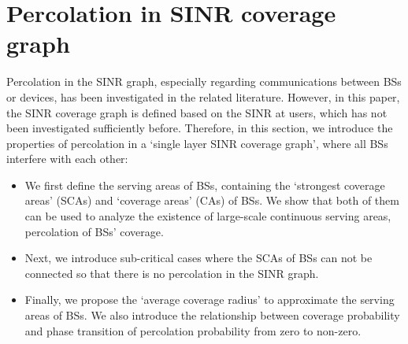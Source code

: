 \documentclass[final]{IEEEtran}
\begin{document}
\section{Percolation in SINR coverage graph} \label{sec:percolation}
Percolation in the SINR graph, especially regarding communications between BSs or devices, has been investigated in the related literature. However, in this paper, the SINR coverage graph is defined based on the SINR at users, which has not been investigated sufficiently before. Therefore, in this section, we introduce the properties of percolation in a `single layer SINR coverage graph', where all BSs interfere with each other:
\begin{itemize}
    \item We first define the serving areas of BSs, containing the `strongest coverage areas' (SCAs) and `coverage areas' (CAs) of BSs. We show that both of them can be used to analyze the existence of large-scale continuous serving areas, \ie percolation of BSs' coverage.
    \item Next, we introduce sub-critical cases where the SCAs of BSs can not be connected so that there is no percolation in the SINR graph. 
    \item Finally, we propose the `average coverage radius' to approximate the serving areas of BSs. We also introduce the relationship between coverage probability and phase transition of percolation probability from zero to non-zero.
\end{itemize}
\end{document}
